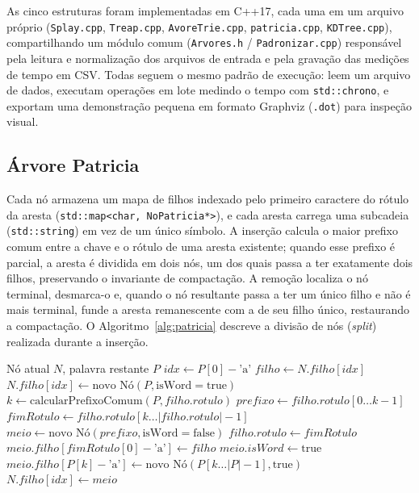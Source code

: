 \documentclass[conference]{IEEEtran}
\begin{document}
As cinco estruturas foram implementadas em C++17, cada uma em um arquivo próprio (\texttt{Splay.cpp}, \texttt{Treap.cpp}, \texttt{AvoreTrie.cpp}, \texttt{patricia.cpp}, \texttt{KDTree.cpp}), compartilhando um módulo comum (\texttt{Arvores.h} / \texttt{Padronizar.cpp}) responsável pela leitura e normalização dos arquivos de entrada e pela gravação das medições de tempo em CSV. Todas seguem o mesmo padrão de execução: leem um arquivo de dados, executam operações em lote medindo o tempo com \texttt{std::chrono}, e exportam uma demonstração pequena em formato Graphviz (\texttt{.dot}) para inspeção visual.

\subsection{Árvore Patricia}
Cada nó armazena um mapa de filhos indexado pelo primeiro caractere do rótulo da aresta (\texttt{std::map<char, NoPatricia*>}), e cada aresta carrega uma subcadeia (\texttt{std::string}) em vez de um único símbolo. A inserção calcula o maior prefixo comum entre a chave e o rótulo de uma aresta existente; quando esse prefixo é parcial, a aresta é dividida em dois nós, um dos quais passa a ter exatamente dois filhos, preservando o invariante de compactação. A remoção localiza o nó terminal, desmarca-o e, quando o nó resultante passa a ter um único filho e não é mais terminal, funde a aresta remanescente com a de seu filho único, restaurando a compactação. O Algoritmo~\ref{alg:patricia} descreve a divisão de nós (\textit{split}) realizada durante a inserção.

\begin{algorithm}[H]
\caption{Divisão de Nós (Split) e Fusão (Merge) na Patricia Trie}
\label{alg:patricia}
\begin{algorithmic}[1]
\REQUIRE Nó atual $N$, palavra restante $P$
\STATE $idx \gets P[0] - \text{'a'}$
\STATE $filho \gets N.filho[idx]$
    \STATE $N.filho[idx] \gets
    \text{novo Nó}(P, \text{isWord}=\text{true})$
    \RETURN
\ENDIF
\STATE $k \gets
\text{calcularPrefixoComum}(P, filho.rotulo)$
    \STATE $prefixo \gets filho.rotulo[0 \dots k-1]$
    \STATE $fimRotulo \gets
    filho.rotulo[k \dots |filho.rotulo|-1]$
    \STATE $meio \gets
    \text{novo Nó}(prefixo, \text{isWord}=\text{false})$
    \STATE $filho.rotulo \gets fimRotulo$
    \STATE $meio.filho[fimRotulo[0]-\text{'a'}]
    \gets filho$
        \STATE $meio.isWord \gets \text{true}$
    \ELSE
        \STATE $meio.filho[P[k]-\text{'a'}]
        \gets \text{novo Nó}(P[k \dots |P|-1], \text{true})$
    \ENDIF
    \STATE $N.filho[idx] \gets meio$
\ENDIF
\end{algorithmic}
\end{algorithm}
\end{document}
